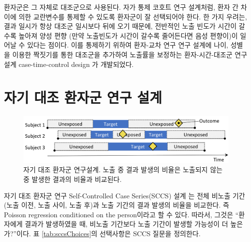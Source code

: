 \documentclass[10.5pt]{book}
\theoremstyle{definition}
\theoremstyle{definition}
\theoremstyle{definition}
\theoremstyle{remark}
\begin{document}
환자군은 그 자체로 대조군으로 사용된다. 자가 통제 코호트 연구 설계처럼,
환자 간 차이에 의한 교란변수를 통제할 수 있도록 환자군이 잘 선택되어야
한다. 한 가지 우려는, 결과 일시가 항상 대조군 일시보다 뒤에 오기 때문에,
전반적인 노출 빈도가 시간이 갈수록 높아져 양성 편향 (만약 노출빈도가
시간이 갈수록 줄어든다면 음성 편향이)이 일어날 수 있다는 점이다. 이를
통제하기 위하여 환자-교차 연구 연구 설계에 나이, 성별을 이용한 짝짓기를
통한 대조군을 추가하여 노출률을 보정하는 환자-시간-대조군 연구 설계
case-time-control design \citep{suissa_1995} 가 개발되었다.

\section{자기 대조 환자군 연구 설계}\label{----}


\begin{figure}[h]

{\centering \includegraphics[width=0.9\linewidth]{images/PopulationLevelEstimation/selfControlledCaseSeries} 

}

\caption{자기 대조 환자군 연구설계. 노출 중 결과 발생의 비율은 노출되지 않는 중 발생한 결과의 비율과 비교된다.}\label{fig:selfControlledCaseSeries}
\end{figure}

자기 대조 환자군 연구 Self-Controlled Case Series(SCCS) 설계
\citep{farrington_1995, whitaker_2006} 는 전체 비노출 기간 (노출 이전,
노출 사이, 노출 후)과 노출 기간의 결과 발생의 비율을 비교한다. 즉
Poisson regression conditioned on the person이라고 할 수 있다. 따라서,
그것은 ``환자에게 결과가 발생하였을 때, 비노출 기간보다 노출 기간이
발생할 가능성이 더 높은가?''이다. 표 \ref{tab:sccsChoices}의 선택사항은
SCCS 질문을 정의한다. 
\end{document}
